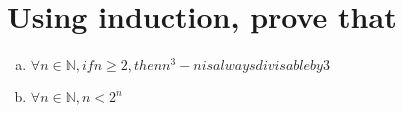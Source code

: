 \section{Using induction, prove that}
\begin{enumerate}[(a)]
\item $\forall n \in \mathbb{N}, if n\geq 2, then n^3-n is always divisable by 3$
\item $\forall n \in \mathbb{N},n < 2^n$
\end{enumerate}
{\Huge\Bat}



